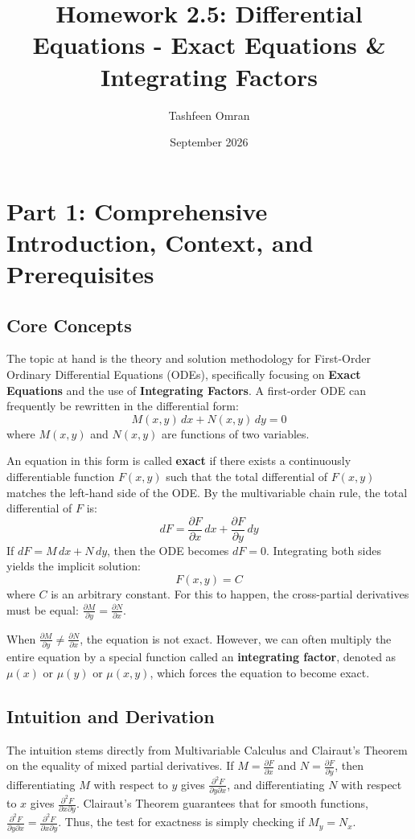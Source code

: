 \documentclass[11pt]{article}
\title{\textbf{Homework 2.5: Differential Equations - Exact Equations \& Integrating Factors}}
\author{Tashfeen Omran}
\date{September 2026}
\begin{document}
\maketitle

\section*{Part 1: Comprehensive Introduction, Context, and Prerequisites}

\subsection*{Core Concepts}
The topic at hand is the theory and solution methodology for First-Order Ordinary Differential Equations (ODEs), specifically focusing on \textbf{Exact Equations} and the use of \textbf{Integrating Factors}.
A first-order ODE can frequently be rewritten in the differential form:
\[ M(x, y) \, dx + N(x, y) \, dy = 0 \]
where $M(x, y)$ and $N(x, y)$ are functions of two variables.

An equation in this form is called \textbf{exact} if there exists a continuously differentiable function $F(x, y)$ such that the total differential of $F(x, y)$ matches the left-hand side of the ODE. By the multivariable chain rule, the total differential of $F$ is:
\[ dF = \frac{\partial F}{\partial x} \, dx + \frac{\partial F}{\partial y} \, dy \]
If $dF = M \, dx + N \, dy$, then the ODE becomes $dF = 0$. Integrating both sides yields the implicit solution:
\[ F(x, y) = C \]
where $C$ is an arbitrary constant. For this to happen, the cross-partial derivatives must be equal: $\frac{\partial M}{\partial y} = \frac{\partial N}{\partial x}$. 

When $\frac{\partial M}{\partial y} \neq \frac{\partial N}{\partial x}$, the equation is not exact. However, we can often multiply the entire equation by a special function called an \textbf{integrating factor}, denoted as $\mu(x)$ or $\mu(y)$ or $\mu(x, y)$, which forces the equation to become exact.

\subsection*{Intuition and Derivation}
The intuition stems directly from Multivariable Calculus and Clairaut's Theorem on the equality of mixed partial derivatives. If $M = \frac{\partial F}{\partial x}$ and $N = \frac{\partial F}{\partial y}$, then differentiating $M$ with respect to $y$ gives $\frac{\partial^2 F}{\partial y \partial x}$, and differentiating $N$ with respect to $x$ gives $\frac{\partial^2 F}{\partial x \partial y}$. Clairaut's Theorem guarantees that for smooth functions, $\frac{\partial^2 F}{\partial y \partial x} = \frac{\partial^2 F}{\partial x \partial y}$. Thus, the test for exactness is simply checking if $M_y = N_x$.
\end{document}
